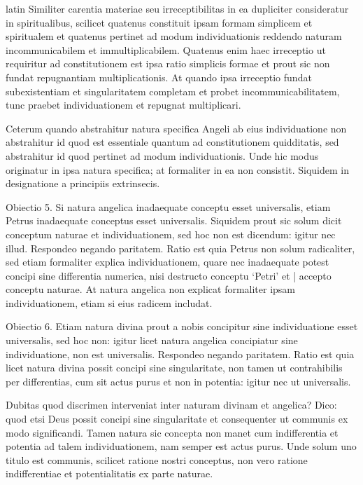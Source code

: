\begin{otherlanguage*}{latin}
\pstart
Similiter carentia materiae seu irreceptibilitas in ea dupliciter consideratur in spiritualibus, scilicet quatenus constituit ipsam formam simplicem et spiritualem et quatenus pertinet ad modum individuationis reddendo naturam incommunicabilem et immultiplicabilem. Quatenus enim haec irreceptio ut requiritur ad constitutionem est ipsa ratio simplicis formae et prout sic non fundat repugnantiam multiplicationis. At quando ipsa irreceptio fundat subexistentiam et singularitatem completam et probet incommunicabilitatem, tunc praebet individuationem et repugnat multiplicari. 
\pend

\pstart
Ceterum quando abstrahitur natura specifica Angeli ab eius individuatione non abstrahitur id quod est essentiale quantum ad constitutionem quidditatis, sed abstrahitur id quod pertinet ad modum individuationis. Unde hic modus originatur in ipsa natura specifica; at formaliter in ea non consistit. Siquidem in designatione a principiis extrinsecis. 
\pend

\pstart
Obiectio 5. Si natura angelica inadaequate conceptu esset universalis, etiam Petrus inadaequate conceptus esset universalis. Siquidem prout sic solum dicit conceptum naturae et individuationem, sed hoc non est dicendum:
igitur nec illud. Respondeo negando paritatem. Ratio est quia Petrus non solum radicaliter, sed etiam formaliter explica individuationem, quare nec inadaequate potest concipi sine differentia numerica, nisi destructo conceptu `Petri' et \textnormal{|} accepto conceptu naturae. At natura angelica non explicat formaliter ipsam individuationem, etiam si eius radicem includat. 
\pend

\pstart
Obiectio 6. Etiam natura divina prout a nobis concipitur sine individuatione esset universalis, sed hoc non:
igitur licet natura angelica concipiatur sine individuatione, non est universalis. Respondeo negando paritatem. Ratio est quia licet natura divina possit concipi sine singularitate, non tamen ut contrahibilis per differentias, cum sit actus purus et non in potentia:
igitur nec ut universalis. 
\pend

\pstart
Dubitas quod discrimen interveniat inter naturam divinam et angelica? Dico:
quod etsi Deus possit concipi sine singularitate et consequenter ut communis ex modo significandi. Tamen natura sic concepta non manet cum indifferentia et potentia ad talem individuationem, nam semper est actus purus. Unde solum uno titulo est communis, scilicet ratione nostri conceptus, non vero ratione indifferentiae et potentialitatis ex parte naturae. 
\pend


\end{otherlanguage*}
